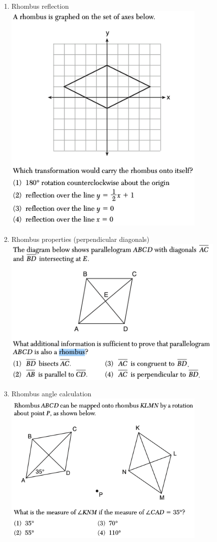 \documentclass[12pt, oneside]{article}
\begin{document}
\begin{enumerate}
\newpage
\item Rhombus reflection\\
\includegraphics[width=10cm]{R-4images/R-4RhombusJ.png}

\item Rhombus properties (perpendicular diagonals)\\
\includegraphics[width=11cm]{R-4images/R-4RhombusD.png}

\newpage
\item Rhombus angle calculation\\
\includegraphics[width=10cm]{R-4images/R-4RhombusK.png}


\end{enumerate}
\end{document}
